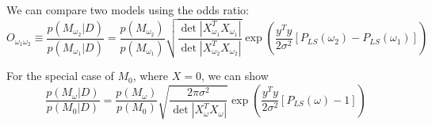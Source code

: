 \documentclass[12pt,pdftex]{article}
\begin{document}
We can compare two models using the odds ratio:
\begin{equation}
  O_{\omega_1\omega_2} \equiv \frac{p(M_{\omega_2}|D)}{p(M_{\omega_1}|D)}
  =\frac{p(M_{\omega_2})}{p(M_{\omega_1})}\sqrt{\frac{\det|X_{\omega_1}^TX_{\omega_1}|}{\det|X_{\omega_2}^TX_{\omega_2}|}}\exp\left(\frac{y^Ty}{2\sigma^2}\left[P_{LS}(\omega_2) - P_{LS}(\omega_1)\right]\right)
\end{equation}

For the special case of $M_0$, where $X = 0$, we can show
\begin{equation}
\frac{p(M_{\omega}|D)}{p(M_0|D)} =
\frac{p(M_{\omega})}{p(M_0)}\sqrt{\frac{2\pi\sigma^2}{\det|X_\omega^TX_\omega|}}\exp\left(\frac{y^Ty}{2\sigma^2}\left[P_{LS}(\omega) - 1\right]\right)
\end{equation}
\end{document}
